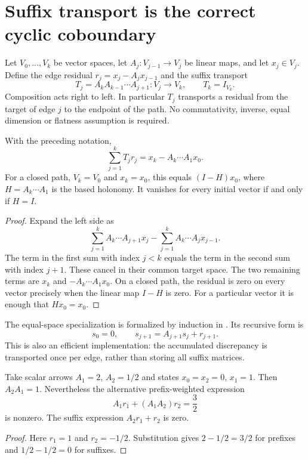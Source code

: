 \section{Suffix transport is the correct cyclic coboundary}

Let $V_0,\ldots,V_k$ be vector spaces, let
$A_j:V_{j-1}\to V_j$ be linear maps, and let $x_j\in V_j$. Define the edge
residual $r_j=x_j-A_jx_{j-1}$ and the suffix transport
\[
 T_j=A_kA_{k-1}\cdots A_{j+1}:V_j\longrightarrow V_k,
 \qquad T_k=I_{V_k}.
\]
Composition acts right to left. In particular $T_j$ transports a residual
from the target of edge $j$ to the endpoint of the path. No commutativity,
inverse, equal dimension or flatness assumption is required.

\begin{theorem}
\label{thm:typed-transport-telescope}
With the preceding notation,
\[
 \sum_{j=1}^{k}T_jr_j=x_k-A_k\cdots A_1x_0.
\]
For a closed path, $V_k=V_0$ and $x_k=x_0$, this equals $(I-H)x_0$, where
$H=A_k\cdots A_1$ is the based holonomy. It vanishes for every initial
vector if and only if $H=I$.
\end{theorem}
\begin{proof}
Expand the left side as
\[
 \sum_{j=1}^{k}A_k\cdots A_{j+1}x_j
 -\sum_{j=1}^{k}A_k\cdots A_jx_{j-1}.
\]
The term in the first sum with index $j<k$ equals the term in the second
sum with index $j+1$. These cancel in their common target space. The two
remaining terms are $x_k$ and $-A_k\cdots A_1x_0$. On a closed path, the
residual is zero on every vector precisely when the linear map $I-H$ is
zero. For a particular vector it is enough that $Hx_0=x_0$.
\end{proof}

The equal-space specialization is formalized by induction in
. Its recursive
form is
\[
 s_0=0,\qquad s_{j+1}=A_{j+1}s_j+r_{j+1}.
\]
This is also an efficient implementation: the accumulated discrepancy is
transported once per edge, rather than storing all suffix matrices.

\begin{proposition}
\label{prop:transport-prefix-counterexample}
Take scalar arrows $A_1=2$, $A_2=1/2$ and states
$x_0=x_2=0$, $x_1=1$. Then $A_2A_1=1$. Nevertheless the alternative
prefix-weighted expression
\[
 A_1r_1+(A_1A_2)r_2=\frac32
\]
is nonzero. The suffix expression $A_2r_1+r_2$ is zero.
\end{proposition}
\begin{proof}
Here $r_1=1$ and $r_2=-1/2$. Substitution gives
$2-1/2=3/2$ for prefixes and $1/2-1/2=0$ for suffixes.
\end{proof}

